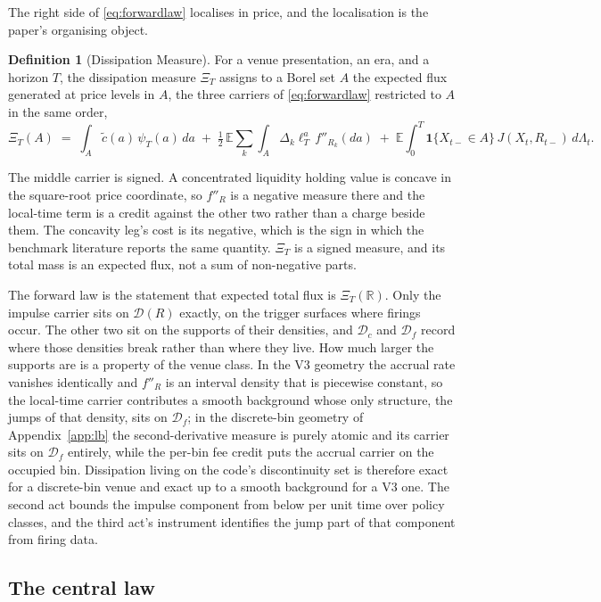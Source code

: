 \documentclass[11pt,a4paper]{article}
\theoremstyle{definition}
\newtheorem{definition}{Definition}
\theoremstyle{plain}
\theoremstyle{remark}
\begin{document}
The right side of \eqref{eq:forwardlaw} localises in price, and the localisation is the paper's organising object.

\begin{definition}[Dissipation Measure]\label{def:ximeasure}
For a venue presentation, an era, and a horizon $T$, the dissipation measure $\Xi_T$ assigns to a Borel set $A$ the expected flux generated at price levels in $A$, the three carriers of
\eqref{eq:forwardlaw} restricted to $A$ in the same order,
\[
\Xi_T(A) \;=\; \int_A \tilde c(a)\, \psi_T(a)\, da
\;+\; \tfrac12\, \mathbb{E} \sum_k \int_A \Delta_k \ell^a_T\,
f''_{R_k}(da)
\;+\; \mathbb{E} \int_0^T \mathbf{1}\{X_{t-} \in A\}\,
J(X_t, R_{t-})\, d\Lambda_t .
\]
\end{definition}

The middle carrier is signed. A concentrated liquidity holding value is concave in the square-root price coordinate, so $f''_R$ is a negative measure there and the local-time term is a credit 
against the other two rather than a charge beside them. The concavity leg's cost is its negative, which is the sign in which the benchmark literature reports the same quantity. $\Xi_T$ is a 
signed measure, and its total mass is an expected flux, not a sum of non-negative parts.

The forward law is the statement that expected total flux is $\Xi_T(\mathbb{R})$. Only the impulse carrier sits on $\mathcal{D}(R)$ exactly, on the trigger surfaces where firings occur. The 
other two sit on the supports of their densities, and $\mathcal{D}_c$ and $\mathcal{D}_f$ record where those densities break rather than where they live. How much larger the supports are is a 
property of the venue class. In the V3 geometry the accrual rate vanishes identically and $f''_R$ is an interval density that is piecewise constant, so the local-time carrier contributes a 
smooth background whose only structure, the jumps of that density, sits on $\mathcal{D}_f$; in the discrete-bin geometry of Appendix~\ref{app:lb} the second-derivative measure is purely atomic 
and its carrier sits on $\mathcal{D}_f$ entirely, while the per-bin fee credit puts the accrual carrier on the occupied bin. Dissipation living on the code's discontinuity set is therefore 
exact for a discrete-bin venue and exact up to a smooth background for a V3 one. The second act bounds the impulse component from below per unit time over policy classes, and the third act's 
instrument identifies the jump part of that component from firing data.

\subsection{The central law}\label{sec:centrallaw}
\end{document}
